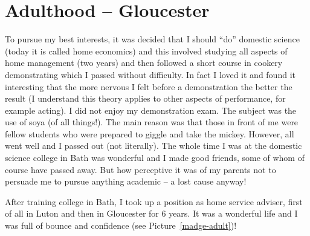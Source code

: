 \enlargethispage{\baselineskip}

\clearpage
\thispagestyle{empty}


\chapter{Adulthood -- Gloucester}

To pursue my best interests, it was decided that I should ``do''
domestic science (today it is called home economics) and this involved
studying all aspects of home management (two years) and then followed
a short course in cookery demonstrating which I passed without
difficulty. In fact I loved it and found it interesting that the more
nervous I felt before a demonstration the better the result (I
understand this theory applies to other aspects of performance, for
example acting). I did not enjoy my demonstration exam. The subject
was the use of soya (of all things!). The main reason was that those
in front of me were fellow students who were prepared to giggle and
take the mickey. However, all went well and I passed out (not
literally). The whole time I was at the domestic science college in
Bath was wonderful and I made good friends, some of whom of course
have passed away. But how perceptive it was of my parents not to
persuade me to pursue anything academic -- a lost cause anyway!

After training college in Bath, I took up a position as home service
adviser, first of all in Luton and then in Gloucester for 6 years. It
was a wonderful life and I was full of bounce and confidence (see
Picture~\ref{madge-adult})!

